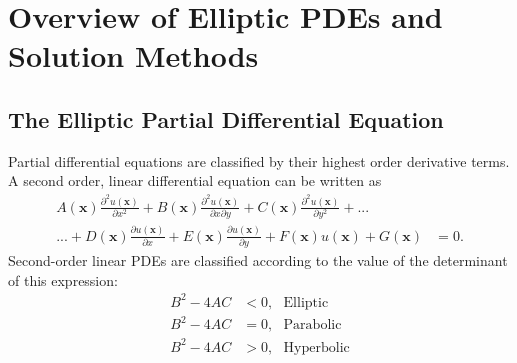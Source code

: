 \section{Overview of Elliptic PDEs and Solution Methods}
\label{sec:the-elliptic-pde}

\subsection{The Elliptic Partial Differential Equation}

Partial differential equations are classified by their highest order derivative terms. A second order, linear differential equation can be written as
\begin{align*}
    A(\textbf{x}) \frac{\partial^2 u(\textbf{x})}{\partial x^2} + B(\textbf{x}) \frac{\partial^2 u(\textbf{x})}{\partial x \partial y} + C(\textbf{x}) \frac{\partial^2 u(\textbf{x})}{\partial y^2} + ... \\
    ... + D(\textbf{x}) \frac{\partial u(\textbf{x})}{\partial x} + E(\textbf{x}) \frac{\partial u(\textbf{x})}{\partial y} + F(\textbf{x}) u(\textbf{x}) + G(\textbf{x}) &= 0.
\end{align*}
Second-order linear PDEs are classified according to the value of the determinant of this expression:
\begin{align*}
    B^2 - 4AC &< 0,\ \ \ \text{Elliptic} \\
    B^2 - 4AC &= 0,\ \ \ \text{Parabolic} \\
    B^2 - 4AC &> 0,\ \ \ \text{Hyperbolic}
\end{align*}

